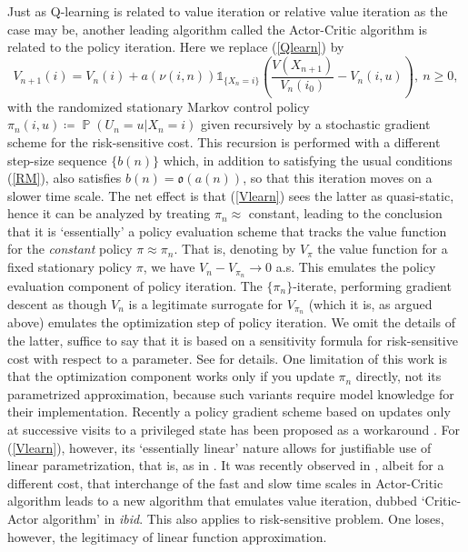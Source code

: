 \documentclass[notitlepage,11pt,reqno]{amsart}
\numberwithin{equation}{section}
\theoremstyle{plain}
\theoremstyle{definition}
\theoremstyle{remark}
\newcommand{\Ind}{\mathds{1}}       %
\DeclareMathOperator{\Prob}{\mathbb{P}} %
\newcommand{\df}{\coloneqq}
\newcommand{\sorder}{{\mathfrak{o}}} %
\begin{document}
Just as Q-learning is related to value iteration or relative value iteration as the case may be, another leading algorithm called the Actor-Critic algorithm is related to the policy iteration. Here we replace (\ref{Qlearn}) by
\begin{equation}
V_{n+1}(i) = V_n(i) + a(\nu(i,n))\Ind_{\{X_n = i\}}\left(\frac{V(X_{n+1})}{V_n(i_0)} - V_n(i,u)\right), \ n \geq 0,\label{Vlearn}
\end{equation}
with the randomized stationary Markov control policy
$\pi_n(i,u) \df \Prob(U_n=u|X_n= i)$ given recursively by a stochastic gradient scheme for the risk-sensitive cost. This recursion is performed with a different step-size sequence $\{b(n)\}$ which, in addition to satisfying the usual conditions (\ref{RM}), also satisfies $b(n) = \sorder(a(n))$, so that this iteration moves on a slower time scale. The net effect is that (\ref{Vlearn}) sees the latter as quasi-static, hence it can be analyzed by treating $\pi_n\approx$ constant,
leading to the conclusion that it is `essentially' a policy evaluation scheme that tracks the value function for the \textit{constant} policy $\pi \approx \pi_n$. That is, denoting by $V_\pi$ the value function for a fixed stationary policy $\pi$, we have $V_n - V_{\pi_n} \to 0$ a.s. This emulates the policy evaluation component of policy iteration. The $\{\pi_n\}$-iterate, performing gradient descent as though $V_n$ is a legitimate surrogate for $V_{\pi_n}$ (which it is, as argued above) emulates the optimization step of policy iteration. We omit the details of the latter, suffice to say that it is based on a sensitivity formula for risk-sensitive cost with respect to a parameter. See \cite{MR2021952} for details. One limitation of this work is that the optimization component works only if you update $\pi_n$ directly, not its parametrized approximation, because such variants require model knowledge for their implementation.  Recently a policy gradient scheme based on updates only at successive visits to a privileged state has been proposed as a workaround \cite{MMRS}.
For (\ref{Vlearn}), however, its `essentially linear' nature allows for justifiable use of linear parametrization, that is, as in \cite{MR2464648}. It was recently observed in \cite{BBG}, albeit for a different cost, that interchange of the fast and slow time scales in Actor-Critic algorithm leads to a new algorithm that emulates value iteration, dubbed `Critic-Actor algorithm' in {\it ibid}. This also applies to risk-sensitive problem. One loses, however, the legitimacy of linear function approximation.
\end{document}
